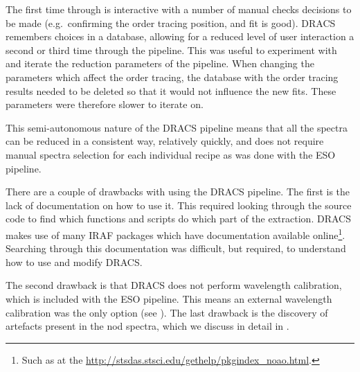 The first time through is interactive with a number of manual checks decisions to be made (e.g.\ confirming the order tracing position, and fit is good).
{DRACS} remembers choices in a database, allowing for a reduced level of user interaction a second or third time through the pipeline.
This was useful to experiment with and iterate the reduction parameters of the pipeline.
When changing the parameters which affect the order tracing, the database with the order tracing results needed to be deleted so that it would not influence the new fits.
These parameters were therefore slower to iterate on.

This semi-autonomous nature of the {DRACS} pipeline means that all the spectra can be reduced in a consistent way, relatively quickly, and does not require manual spectra selection for each individual recipe as was done with the {ESO} pipeline.

There are a couple of drawbacks with using the {DRACS} pipeline.
The first is the lack of documentation on how to use it.
This required looking through the source code to find which functions and scripts do which part of the extraction.
{DRACS} makes use of many {IRAF} packages which have documentation available online\footnote{Such as at the \href{Space Telescope Science Institute}{http://stsdas.stsci.edu/gethelp/pkgindex\_noao.html}.}.
Searching through this documentation was difficult, but required, to understand how to use and modify {DRACS}.

The second drawback is that {DRACS} does not perform wavelength calibration, which is included with the {ESO} pipeline.
This means an external wavelength calibration was the only option (see ).
The last drawback is the discovery of artefacts present in the nod spectra, which we discuss in detail in .

